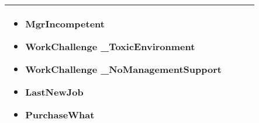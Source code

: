 \begin{minipage}{\textwidth}
\begin{table}[H]
\begin{center}
\begin{tabular}{|P{.1\textwidth}|P{.26\textwidth}|P{.26\textwidth}|P{.26\textwidth}|}
\begin{itemize}
                             \item MgrIncompetent
                             \item WorkChallenge \_ToxicEnvironment
                             \item WorkChallenge \_NoManagementSupport
                             \item LastNewJob
                             \item PurchaseWhat
                         \end{itemize} \\
                         \hline
                     \end{tabular}
                 \end{center}
                 \raggedright\source{\ownwork}
                 \vspace{0.75cm}
             \end{table}
\end{minipage}

